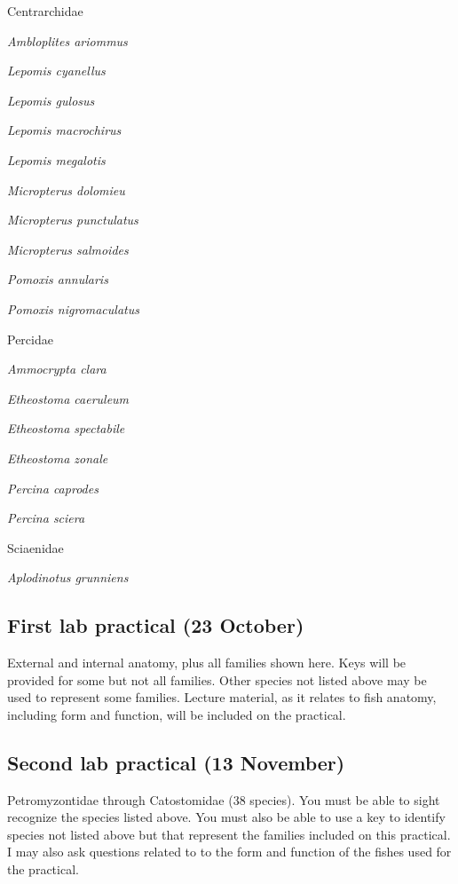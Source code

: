 \documentclass[11pt]{article}
\newcommand{\VSpace}{\vspace{\baselineskip}}
\begin{document}
\begin{multicols}{2}
Centrarchidae\par
	\quad\textit{Ambloplites ariommus}\par
	\quad\textit{Lepomis cyanellus}\par
	\quad\textit{Lepomis gulosus}\par
	\quad\textit{Lepomis macrochirus}\par
	\quad\textit{Lepomis megalotis}\par
	\quad\textit{Micropterus dolomieu}\par
	\quad\textit{Micropterus punctulatus}\par
	\quad\textit{Micropterus salmoides}\par
	\quad\textit{Pomoxis annularis}\par
	\quad\textit{Pomoxis nigromaculatus}\par
\vspace{1ex}

Percidae\par
	\quad\textit{Ammocrypta clara}\par
	\quad\textit{Etheostoma caeruleum}\par
	\quad\textit{Etheostoma spectabile}\par
	\quad\textit{Etheostoma zonale}\par
	\quad\textit{Percina caprodes}\par
	\quad\textit{Percina sciera}\par
\vspace{1ex}

Sciaenidae\par
	\quad\textit{Aplodinotus grunniens}
\end{multicols}

\subsection*{First lab practical (23 October)}

External and internal anatomy, plus all families shown here.  Keys will be provided for some but not all families.  Other species not listed above may be used to represent some families. Lecture material, as it relates to fish anatomy, including form and function, will be included on the practical.%


\subsection*{Second lab practical (13 November)}

Petromyzontidae through Catostomidae (38 species).  You must be able to sight recognize the species listed above.  You must also be able to use a key to identify species not listed above but that represent the families included on this practical. I may also ask questions related to to the form and function of the fishes used for the practical.%
\end{document}
